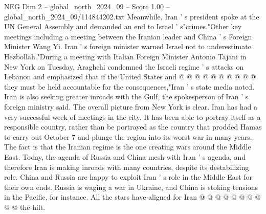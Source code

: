 \begin{textsample}{NEG Dim 2 – global\_north\_2024\_09 – Score 1.00 – global\_north\_2024\_09/114844202.txt}
Meanwhile, Iran ' s president spoke at the UN General Assembly and demanded an end to Israel ' s"crimes."Other key meetings including a meeting between the Iranian leader and China ' s Foreign Minister Wang Yi.
Iran ' s foreign minister warned Israel not to underestimate Hezbollah."During a meeting with Italian Foreign Minister Antonio Tajani in New York on Tuesday, Araghchi condemned the Israeli regime ' s attacks on Lebanon and emphasized that if the United States and @ @ @ @ @ @ @ @ @ @ they must be held accountable for the consequences,"Iran ' s state media noted.
Iran is also seeking greater inroads with the Gulf, the spokesperson of Iran ' s foreign ministry said.
The overall picture from New York is clear.
Iran has had a very successful week of meetings in the city.
It has been able to portray itself as a responsible country, rather than be portrayed as the country that prodded Hamas to carry out October 7 and plunge the region into its worst war in many years.
The fact is that the Iranian regime is the one creating wars around the Middle East.
Today, the agenda of Russia and China mesh with Iran ' s agenda, and therefore Iran is making inroads with many countries, despite its destabilizing role.
China and Russia are happy to exploit Iran ' s role in the Middle East for their own ends.
Russia is waging a war in Ukraine, and China is stoking tensions in the Pacific, for instance.
All the stars have aligned for Iran @ @ @ @ @ @ @ @ @ @ the hilt.

\end{textsample}
